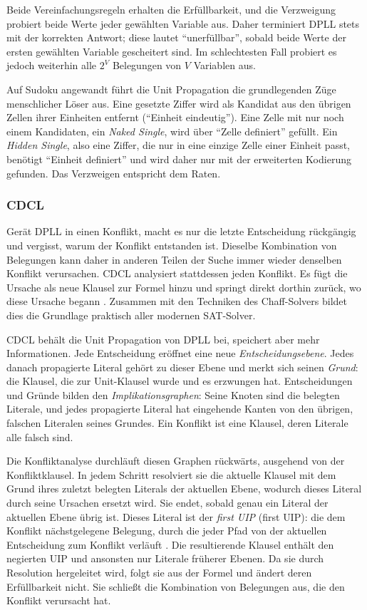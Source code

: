 Beide Vereinfachungsregeln erhalten die Erfüllbarkeit, und die Verzweigung probiert beide Werte jeder gewählten Variable aus.
Daher terminiert DPLL stets mit der korrekten Antwort; diese lautet \enquote{unerfüllbar}, sobald beide Werte der ersten gewählten Variable gescheitert sind.
Im schlechtesten Fall probiert es jedoch weiterhin alle $2^V$ Belegungen von $V$ Variablen aus.

Auf Sudoku angewandt führt die Unit Propagation die grundlegenden Züge menschlicher Löser aus.
Eine gesetzte Ziffer wird als Kandidat aus den übrigen Zellen ihrer Einheiten entfernt (\enquote{Einheit eindeutig}).
Eine Zelle mit nur noch einem Kandidaten, ein \emph{Naked Single}, wird über \enquote{Zelle definiert} gefüllt.
Ein \emph{Hidden Single}, also eine Ziffer, die nur in eine einzige Zelle einer Einheit passt, benötigt \enquote{Einheit definiert} und wird daher nur mit der erweiterten Kodierung gefunden.
Das Verzweigen entspricht dem Raten.

\subsubsection{CDCL} \label{sec:cdcl}

Gerät DPLL in einen Konflikt, macht es nur die letzte Entscheidung rückgängig und vergisst, warum der Konflikt entstanden ist.
Dieselbe Kombination von Belegungen kann daher in anderen Teilen der Suche immer wieder denselben Konflikt verursachen.
\acs{CDCL} analysiert stattdessen jeden Konflikt.
Es fügt die Ursache als neue Klausel zur Formel hinzu und springt direkt dorthin zurück, wo diese Ursache begann .
Zusammen mit den Techniken des Chaff-Solvers  bildet dies die Grundlage praktisch aller modernen \acs{SAT}-Solver.

\acs{CDCL} behält die Unit Propagation von DPLL bei, speichert aber mehr Informationen.
Jede Entscheidung eröffnet eine neue \emph{Entscheidungsebene}.
Jedes danach propagierte Literal gehört zu dieser Ebene und merkt sich seinen \emph{Grund}: die Klausel, die zur Unit-Klausel wurde und es erzwungen hat.
Entscheidungen und Gründe bilden den \emph{Implikationsgraphen}: Seine Knoten sind die belegten Literale, und jedes propagierte Literal hat eingehende Kanten von den übrigen, falschen Literalen seines Grundes.
Ein Konflikt ist eine Klausel, deren Literale alle falsch sind.

Die Konfliktanalyse durchläuft diesen Graphen rückwärts, ausgehend von der Konfliktklausel.
In jedem Schritt resolviert sie die aktuelle Klausel mit dem Grund ihres zuletzt belegten Literals der aktuellen Ebene, wodurch dieses Literal durch seine Ursachen ersetzt wird.
Sie endet, sobald genau ein Literal der aktuellen Ebene übrig ist.
Dieses Literal ist der \emph{first \acl{UIP}} (first \acs{UIP}): die dem Konflikt nächstgelegene Belegung, durch die jeder Pfad von der aktuellen Entscheidung zum Konflikt verläuft .
Die resultierende Klausel enthält den negierten \acs{UIP} und ansonsten nur Literale früherer Ebenen.
Da sie durch Resolution hergeleitet wird, folgt sie aus der Formel und ändert deren Erfüllbarkeit nicht.
Sie schließt die Kombination von Belegungen aus, die den Konflikt verursacht hat.

